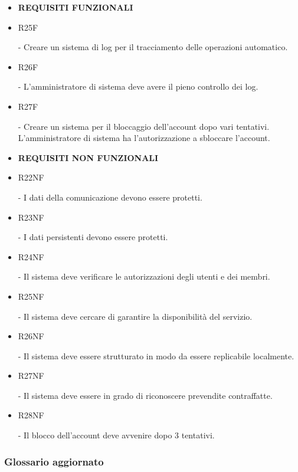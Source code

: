 \documentclass[a4paper]{article}
\begin{document}
\begin{itemize}
    \item \textbf{REQUISITI FUNZIONALI}
    
    \item \hypertarget{R25F}{R25F} - Creare un sistema di log per il tracciamento delle operazioni automatico.
    \item \hypertarget{R26F}{R26F} - L'amministratore di sistema deve avere il pieno controllo dei log.
    \item \hypertarget{R27F}{R27F} - Creare un sistema per il bloccaggio dell'account dopo vari tentativi. L'amministratore di sistema ha l'autorizzazione a sbloccare l'account.
    
    \item \textbf{REQUISITI NON FUNZIONALI}
    
    \item \hypertarget{R22NF}{R22NF} - I dati della comunicazione devono essere protetti.
    \item \hypertarget{R23NF}{R23NF} - I dati persistenti devono essere protetti.
    \item \hypertarget{R24NF}{R24NF} - Il sistema deve verificare le autorizzazioni degli utenti e dei membri.
    \item \hypertarget{R25NF}{R25NF} - Il sistema deve cercare di garantire la disponibilità del servizio.
    \item \hypertarget{R26NF}{R26NF} - Il sistema deve essere strutturato in modo da essere replicabile localmente.
    \item \hypertarget{R27NF}{R27NF} - Il sistema deve essere in grado di riconoscere prevendite contraffatte.
    \item \hypertarget{R28NF}{R28NF} - Il blocco dell'account deve avvenire dopo 3 tentativi.
    
\end{itemize}

\subsubsection{Glossario aggiornato}
\end{document}
